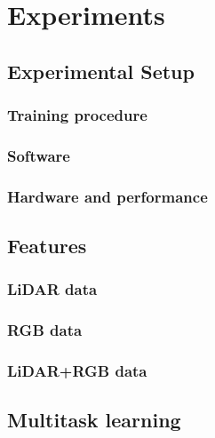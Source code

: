 \chapter{Experiments}%
\label{sec:experiments}


\section{Experimental Setup}%
\label{sec:experimental-setup}
\subsection{Training procedure}

\subsection{Software}

\subsection{Hardware and performance}


\section{Features}%
\label{sec:features}

\subsection{LiDAR data}

\subsection{RGB data}

\subsection{LiDAR+RGB data}


\section{Multitask learning}\label{sec:multitask-experiments}

